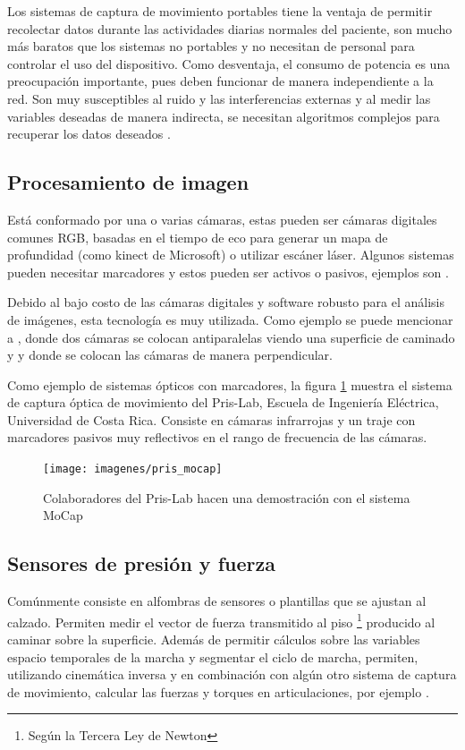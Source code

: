 Los sistemas de captura de movimiento portables tiene la ventaja de permitir recolectar datos durante las actividades diarias normales del paciente, son mucho más baratos que los sistemas no portables y no necesitan de personal para controlar el uso del dispositivo. Como desventaja, el consumo de potencia es una preocupación importante, pues deben funcionar de manera independiente a la red. Son muy susceptibles al ruido y las interferencias externas y al medir las variables deseadas de manera indirecta, se necesitan algoritmos complejos para recuperar los datos deseados \citep{muro}.

\subsection{Procesamiento de imagen}

Está conformado por una o varias cámaras, estas pueden ser cámaras digitales comunes RGB, basadas en el tiempo de eco para generar un mapa de profundidad (como kinect de Microsoft) o utilizar escáner láser. Algunos sistemas pueden necesitar marcadores y estos pueden ser activos o pasivos, ejemplos son \cite{prakash, yang2}. \citep{muro}

Debido al bajo costo de las cámaras digitales y software robusto para el análisis de imágenes, esta tecnología es muy utilizada. Como ejemplo se puede mencionar a \cite{hoang}, donde dos cámaras se colocan antiparalelas viendo una superficie de caminado y \cite{li} y \cite{mrozowski} donde se colocan las cámaras de manera perpendicular. 

Como ejemplo de sistemas ópticos con marcadores, la figura \ref{fig:pris_mocap} muestra el sistema de captura óptica de movimiento  del Pris-Lab, Escuela de Ingeniería Eléctrica, Universidad de Costa Rica. Consiste en cámaras infrarrojas y un traje con marcadores pasivos muy reflectivos en el rango de frecuencia de las cámaras. 

\begin{figure}
    \centering
    \texttt{[image: imagenes/pris\_mocap]}
    \caption{Colaboradores del Pris-Lab hacen una demostración con el sistema MoCap}
    \label{fig:pris_mocap}
\end{figure}

\subsection{Sensores de presión y fuerza}

Comúnmente consiste en alfombras de sensores o plantillas que se ajustan al calzado. Permiten medir el vector de fuerza transmitido al piso \footnote{Según la Tercera Ley de Newton} producido al caminar sobre la superficie. Además de permitir cálculos sobre las variables espacio temporales de la marcha y segmentar el ciclo de marcha, permiten, utilizando cinemática inversa y en combinación con algún otro sistema de captura de movimiento, calcular las fuerzas y torques en articulaciones, por ejemplo \cite{mizoguchi}.

